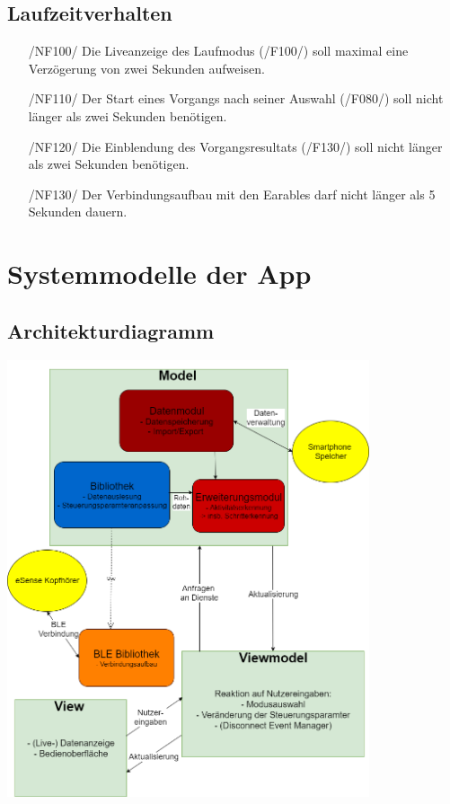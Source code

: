 \documentclass[a4paper,12pt]{article}
\begin{document}
\subsection{Laufzeitverhalten}
\begin{itemize}
  \item[/NF100/] Die Liveanzeige des Laufmodus (/F100/) soll maximal eine Verzögerung von zwei Sekunden aufweisen. 
  \item[/NF110/] Der Start eines Vorgangs nach seiner Auswahl (/F080/) soll nicht länger als zwei Sekunden benötigen. 
  \item[/NF120/] Die Einblendung des Vorgangsresultats (/F130/) soll nicht länger als zwei Sekunden benötigen.
  \item[/NF130/] Der Verbindungsaufbau mit den \Gls{Earables} darf nicht länger als 5 Sekunden dauern.

\end{itemize}
\section{Systemmodelle der App}
  \subsection{Architekturdiagramm}
  \begin{center}
  	\vspace{100px}
  	\includegraphics[width=0.8\textwidth]{./Diagramme/Archi4.png}
  \end{center}
  \clearpage %
\end{document}

